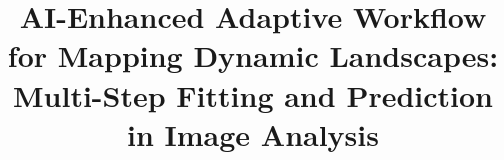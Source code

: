 \documentclass[sn-mathphys-num]{sn-jnl}%
\theoremstyle{thmstyleone}%
\theoremstyle{thmstyletwo}%
\theoremstyle{thmstylethree}%
\begin{document}
\title[AI-Enhanced Adaptive Workflow for Mapping Dynamic Landscapes: Multi-Step Fitting and Prediction in Image Analysis]{AI-Enhanced Adaptive Workflow for Mapping Dynamic Landscapes: Multi-Step Fitting and Prediction in Image Analysis}




\author*[1]{ }


\end{document}
